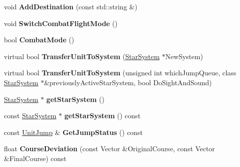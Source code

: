 \begin{DoxyCompactItemize}
\item 
void {\bfseries Add\+Destination} (const std\+::string \&)\hypertarget{classUnit_a2cd633b2a771545ffac093af3bd4da4c}{}\label{classUnit_a2cd633b2a771545ffac093af3bd4da4c}

\item 
void {\bfseries Switch\+Combat\+Flight\+Mode} ()\hypertarget{classUnit_a92a8c8d22ff2dc065489b396db9aea8e}{}\label{classUnit_a92a8c8d22ff2dc065489b396db9aea8e}

\item 
bool {\bfseries Combat\+Mode} ()\hypertarget{classUnit_a83e52b26f1bc3346f90512c7697c97e8}{}\label{classUnit_a83e52b26f1bc3346f90512c7697c97e8}

\item 
virtual bool {\bfseries Transfer\+Unit\+To\+System} (\hyperlink{classStarSystem}{Star\+System} $\ast$New\+System)\hypertarget{classUnit_a331a5c17b6093004e2bb514d76989fe1}{}\label{classUnit_a331a5c17b6093004e2bb514d76989fe1}

\item 
virtual bool {\bfseries Transfer\+Unit\+To\+System} (unsigned int which\+Jump\+Queue, class \hyperlink{classStarSystem}{Star\+System} $\ast$\&previously\+Active\+Star\+System, bool Do\+Sight\+And\+Sound)\hypertarget{classUnit_a83ca46a6843d2936267489c2bb89352a}{}\label{classUnit_a83ca46a6843d2936267489c2bb89352a}

\item 
\hyperlink{classStarSystem}{Star\+System} $\ast$ {\bfseries get\+Star\+System} ()\hypertarget{classUnit_ab476993be14c803867014d10a99c801f}{}\label{classUnit_ab476993be14c803867014d10a99c801f}

\item 
const \hyperlink{classStarSystem}{Star\+System} $\ast$ {\bfseries get\+Star\+System} () const \hypertarget{classUnit_ac1874e12bad92a64f6fa8d4905218d23}{}\label{classUnit_ac1874e12bad92a64f6fa8d4905218d23}

\item 
const \hyperlink{structUnit_1_1UnitJump}{Unit\+Jump} \& {\bfseries Get\+Jump\+Status} () const \hypertarget{classUnit_aa6cb069304d77f4614fa77cbc42fc70a}{}\label{classUnit_aa6cb069304d77f4614fa77cbc42fc70a}

\item 
float {\bfseries Course\+Deviation} (const Vector \&Original\+Course, const Vector \&Final\+Course) const \hypertarget{classUnit_ac7c39ef6234abbce813b0718fbe66bd4}{}\label{classUnit_ac7c39ef6234abbce813b0718fbe66bd4}


\end{DoxyCompactItemize}
